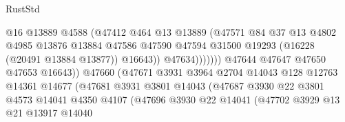 \begin{lexlean}{RustStd}
\begin{coremodule}
                                            @16
                                            @13889
                                            @4588
                                            (@47412
                                              @464
                                              @13
                                              @13889
                                              (@47571
                                                @84
                                                @37
                                                @13
                                                @4802
                                                @4985
                                                @13876
                                                @13884
                                                @47586
                                                @47590
                                                @47594
                                                @31500
                                                @19293
                                                (@16228 (@20491 @13884 @13877))
                                                @16643))
                                            @47634)))))))
                              @47644
                              @47647
                              @47650
                              @47653
                              @16643))
                          @47660
                          (@47671
                            @3931
                            @3964
                            @2704
                            @14043
                            @128
                            @12763
                            @14361
                            @14677
                            (@47681
                              @3931
                              @3801
                              @14043
                              (@47687
                                @3930
                                @22
                                @3801
                                @4573
                                @14041
                                @4350
                                @4107
                                (@47696
                                  @3930
                                  @22
                                  @14041
                                  (@47702
                                    @3929
                                    @13
                                    @21
                                    @13917
                                    @14040

\end{coremodule}
\end{lexlean}

